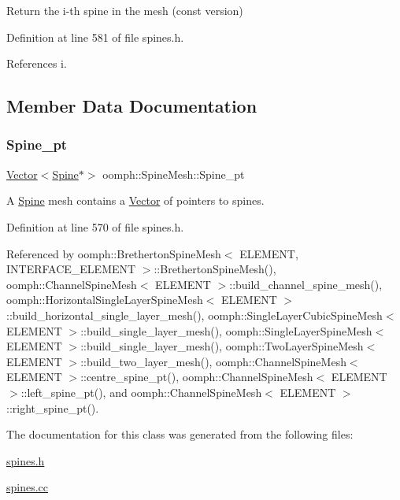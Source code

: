 Return the i-\/th spine in the mesh (const version) 



Definition at line 581 of file spines.\+h.



References i.



\subsection{Member Data Documentation}
\mbox{\label{classoomph_1_1SpineMesh_a4f3e5e603b61921f52a4311d347d1158}} 
\subsubsection{\texorpdfstring{Spine\+\_\+pt}{Spine\_pt}}
{\footnotesize\ttfamily \hyperlink{classoomph_1_1Vector}{Vector}$<$\hyperlink{classoomph_1_1Spine}{Spine}$\ast$$>$ oomph\+::\+Spine\+Mesh\+::\+Spine\+\_\+pt\hspace{0.3cm}{\ttfamily [protected]}}



A \hyperlink{classoomph_1_1Spine}{Spine} mesh contains a \hyperlink{classoomph_1_1Vector}{Vector} of pointers to spines. 



Definition at line 570 of file spines.\+h.



Referenced by oomph\+::\+Bretherton\+Spine\+Mesh$<$ E\+L\+E\+M\+E\+N\+T, I\+N\+T\+E\+R\+F\+A\+C\+E\+\_\+\+E\+L\+E\+M\+E\+N\+T $>$\+::\+Bretherton\+Spine\+Mesh(), oomph\+::\+Channel\+Spine\+Mesh$<$ E\+L\+E\+M\+E\+N\+T $>$\+::build\+\_\+channel\+\_\+spine\+\_\+mesh(), oomph\+::\+Horizontal\+Single\+Layer\+Spine\+Mesh$<$ E\+L\+E\+M\+E\+N\+T $>$\+::build\+\_\+horizontal\+\_\+single\+\_\+layer\+\_\+mesh(), oomph\+::\+Single\+Layer\+Cubic\+Spine\+Mesh$<$ E\+L\+E\+M\+E\+N\+T $>$\+::build\+\_\+single\+\_\+layer\+\_\+mesh(), oomph\+::\+Single\+Layer\+Spine\+Mesh$<$ E\+L\+E\+M\+E\+N\+T $>$\+::build\+\_\+single\+\_\+layer\+\_\+mesh(), oomph\+::\+Two\+Layer\+Spine\+Mesh$<$ E\+L\+E\+M\+E\+N\+T $>$\+::build\+\_\+two\+\_\+layer\+\_\+mesh(), oomph\+::\+Channel\+Spine\+Mesh$<$ E\+L\+E\+M\+E\+N\+T $>$\+::centre\+\_\+spine\+\_\+pt(), oomph\+::\+Channel\+Spine\+Mesh$<$ E\+L\+E\+M\+E\+N\+T $>$\+::left\+\_\+spine\+\_\+pt(), and oomph\+::\+Channel\+Spine\+Mesh$<$ E\+L\+E\+M\+E\+N\+T $>$\+::right\+\_\+spine\+\_\+pt().



The documentation for this class was generated from the following files\+:\begin{DoxyCompactItemize}
\item 
\hyperlink{spines_8h}{spines.\+h}\item 
\hyperlink{spines_8cc}{spines.\+cc}\end{DoxyCompactItemize}
